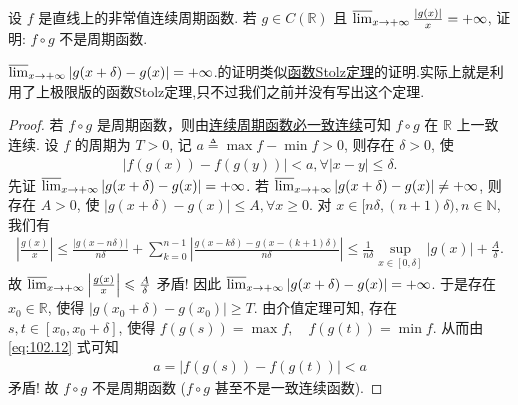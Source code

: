 \documentclass[../../main.tex]{subfiles}%
\begin{document}
\begin{example}
设 $f$ 是直线上的非常值连续周期函数. 若 $g \in C(\mathbb{R})$ 且 $\varlimsup_{x \to +\infty} \frac{|g(x)|}{x} = +\infty$, 证明: $f \circ g$ 不是周期函数.
\end{example}
\begin{note}
$\varlimsup_{x \to +\infty} |g(x + \delta) - g(x)| = +\infty$.的证明类似\hyperref[theorem:函数Stolz定理]{函数Stolz定理}的证明.实际上就是利用了上极限版的函数Stolz定理,只不过我们之前并没有写出这个定理.
\end{note}
\begin{proof}

若 $f \circ g$ 是周期函数，则由\hyperref[proposition:连续周期函数必一致连续]{连续周期函数必一致连续}可知 $f \circ g$ 在 $\mathbb{R}$ 上一致连续.
设 $f$ 的周期为 $T > 0$, 记 $a \triangleq \max f - \min f > 0$, 则存在 $\delta > 0$, 使
\begin{align}
|f(g(x)) - f(g(y))| < a, \forall |x - y| \leqslant \delta. \label{eq:102.12}
\end{align}
先证 $\varlimsup_{x \to +\infty} |g(x + \delta) - g(x)| = +\infty$. 若 $\varlimsup_{x \to +\infty} |g(x + \delta) - g(x)| \ne +\infty$, 则存在 $A > 0$, 使
$|g(x + \delta) - g(x)| \leqslant A, \forall x \geqslant 0.$
对 $x \in [n\delta, (n + 1)\delta), n \in \mathbb{N}$, 我们有
\begin{align*}
\left| \frac{g(x)}{x} \right| \leqslant \frac{|g(x - n\delta)|}{n\delta} + \sum_{k=0}^{n - 1} \left| \frac{g(x - k\delta) - g(x - (k + 1)\delta)}{n\delta} \right| \leqslant \frac{1}{n\delta} \sup_{x \in [0, \delta]} |g(x)| + \frac{A}{\delta}.
\end{align*}
故 $\varlimsup_{x \to +\infty} \left| \frac{g(x)}{x} \right| \leqslant \frac{A}{\delta}$ 矛盾! 因此 $\varlimsup_{x \to +\infty} |g(x + \delta) - g(x)| = +\infty$.
于是存在 $x_0 \in \mathbb{R}$, 使得 $|g(x_0 + \delta) - g(x_0)| \geqslant T$. 由介值定理可知, 存在 $s, t \in [x_0, x_0 + \delta]$, 使得
$f(g(s)) = \max f, \quad f(g(t)) = \min f.$
从而由 \eqref{eq:102.12} 式可知
\begin{align*}
a = |f(g(s)) - f(g(t))| < a
\end{align*}
矛盾! 故 $f \circ g$ 不是周期函数 ($f \circ g$ 甚至不是一致连续函数).

\end{proof}
\end{document}
